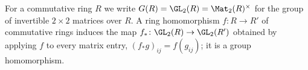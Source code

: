 For a commutative ring $R$ we write $G(R)=\GL_2(R)=\Mat_2(R)^\times$ for the group of invertible $2\times2$ matrices
over $R$. A ring homomorphism $f\colon R\to R'$ of commutative rings induces the map
$f_*\colon\GL_2(R)\to\GL_2(R')$ obtained by applying $f$ to every matrix entry, $(f_*g)_{ij}=f(g_{ij})$; it is a group
homomorphism.
